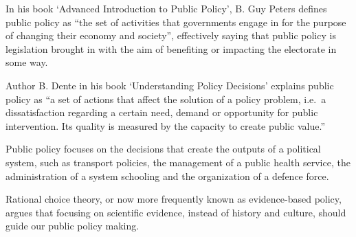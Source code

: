 \documentclass[
  openany]{book}
\begin{document}
In his book `Advanced Introduction to Public Policy', B. Guy Peters defines public policy as ``the set of activities that governments engage in for the purpose of changing their economy and society'', effectively saying that public policy is legislation brought in with the aim of benefiting or impacting the electorate in some way.

Author B. Dente in his book `Understanding Policy Decisions' explains public policy as ``a set of actions that affect the solution of a policy problem, i.e.~a dissatisfaction regarding a certain need, demand or opportunity for public intervention. Its quality is measured by the capacity to create public value.''

Public policy focuses on the decisions that create the outputs of a political system, such as transport policies, the management of a public health service, the administration of a system schooling and the organization of a defence force.

Rational choice theory, or now more frequently known as evidence-based policy, argues that focusing on scientific evidence, instead of history and culture, should guide our public policy making.
\end{document}
